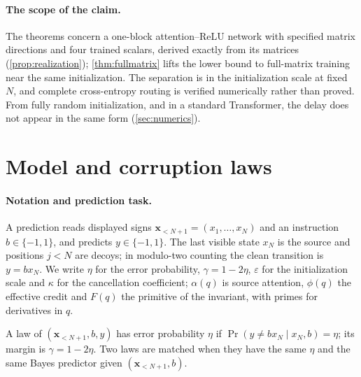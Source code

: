 \paragraph{The scope of the claim.} The theorems concern a one-block attention--ReLU network with specified matrix directions and four trained scalars,
derived exactly from its matrices (\cref{prop:realization}); \cref{thm:fullmatrix} lifts the lower bound to full-matrix training near the same initialization.
The separation is in the initialization scale at fixed $N$, and complete cross-entropy routing is verified numerically rather than proved.
From fully random initialization, and in a standard Transformer, the delay does not appear in the same form (\cref{sec:numerics}).

\section{Model and corruption laws}
\label{sec:setup}
\paragraph{Notation and prediction task.}
A prediction reads displayed signs $\bm x_{<N+1}=(x_1,\ldots,x_N)$ and an instruction $b\in\{-1,1\}$, and predicts $y\in\{-1,1\}$.
The last visible state $x_N$ is the source and positions $j<N$ are decoys; in modulo-two counting the clean transition is $y=b x_N$.
We write $\eta$ for the error probability, $\gamma=1-2\eta$, $\varepsilon$ for the initialization scale and $\kappa$ for the cancellation coefficient;
$\alpha(q)$ is source attention, $\phi(q)$ the effective credit and $F(q)$ the primitive of the invariant, with primes for derivatives in $q$.

\begin{definition}
\label{def:law}
A law of $(\bm x_{<N+1},b,y)$ has error probability $\eta$ if
$\Pr(y\ne b x_N\mid x_N,b)=\eta$; its margin is $\gamma=1-2\eta$.
Two laws are matched when they have the same $\eta$ and the same Bayes predictor given $(\bm x_{<N+1},b)$.
\end{definition}

